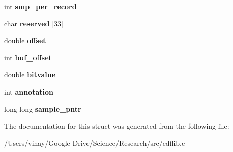 \begin{DoxyCompactItemize}
\item 
\hypertarget{structedfparamblock_ab68a755d813a03cba7e203e735b970bb}{}int {\bfseries smp\+\_\+per\+\_\+record}\label{structedfparamblock_ab68a755d813a03cba7e203e735b970bb}

\item 
\hypertarget{structedfparamblock_a0f6ffc88c0bb13779e4466bdda521254}{}char {\bfseries reserved} \mbox{[}33\mbox{]}\label{structedfparamblock_a0f6ffc88c0bb13779e4466bdda521254}

\item 
\hypertarget{structedfparamblock_a0e029e4d615289025a54026b274861f1}{}double {\bfseries offset}\label{structedfparamblock_a0e029e4d615289025a54026b274861f1}

\item 
\hypertarget{structedfparamblock_a87f823f59bffc6fcaf1bddcfbdc9ad85}{}int {\bfseries buf\+\_\+offset}\label{structedfparamblock_a87f823f59bffc6fcaf1bddcfbdc9ad85}

\item 
\hypertarget{structedfparamblock_a52dccf27ff297dd324644fe6ece63e0d}{}double {\bfseries bitvalue}\label{structedfparamblock_a52dccf27ff297dd324644fe6ece63e0d}

\item 
\hypertarget{structedfparamblock_acacbf2368450e62412bc2c80b956c6ed}{}int {\bfseries annotation}\label{structedfparamblock_acacbf2368450e62412bc2c80b956c6ed}

\item 
\hypertarget{structedfparamblock_ac0e7a3accc91e4e11c56671acf2666a2}{}long long {\bfseries sample\+\_\+pntr}\label{structedfparamblock_ac0e7a3accc91e4e11c56671acf2666a2}

\end{DoxyCompactItemize}


The documentation for this struct was generated from the following file\+:\begin{DoxyCompactItemize}
\item 
/\+Users/vinay/\+Google Drive/\+Science/\+Research/src/edflib.\+c\end{DoxyCompactItemize}
